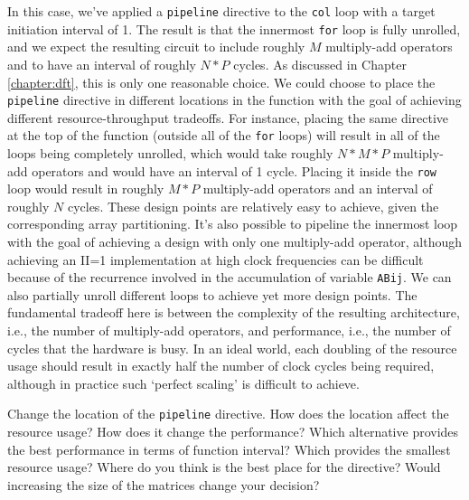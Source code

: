 In this case, we've applied a \lstinline{pipeline} directive to the \lstinline{col} loop with a target initiation interval of 1. The result is that the innermost \lstinline{for} loop is fully unrolled, and we expect the resulting circuit to include roughly $M$ multiply-add operators and to have an interval of roughly $N*P$ cycles.  As discussed in Chapter \ref{chapter:dft}, this is only one reasonable choice.  We could choose to place the \lstinline{pipeline} directive in different locations in the function with the goal of achieving different resource-throughput tradeoffs. For instance, placing the same directive at the top of the function (outside all of the \lstinline{for} loops) will result in all of the loops being completely unrolled, which would take roughly $N*M*P$ multiply-add operators and would have an interval of 1 cycle. Placing it inside the \lstinline{row} loop would result in roughly $M*P$ multiply-add operators and an interval of roughly $N$ cycles. These design points are relatively easy to achieve, given the corresponding array partitioning.  It's also possible to pipeline the innermost loop with the goal of achieving a design with only one multiply-add operator, although achieving an II=1 implementation at high clock frequencies can be difficult because of the recurrence involved in the accumulation of variable \lstinline{ABij}.  We can also partially unroll different loops to achieve yet more design points.  The fundamental tradeoff here is between the complexity of the resulting architecture, i.e., the number of multiply-add operators, and performance, i.e., the number of cycles that the hardware is busy.  In an ideal world, each doubling of the resource usage should result in exactly half the number of clock cycles being required, although in practice such `perfect scaling' is difficult to achieve.

\begin{exercise}
Change the location of the \lstinline{pipeline} directive. How does the location affect the resource usage? How does it change the performance? Which alternative provides the best performance in terms of function interval? Which provides the smallest resource usage? Where do you think is the best place for the directive? Would increasing the size of the matrices change your decision?
\end{exercise}

